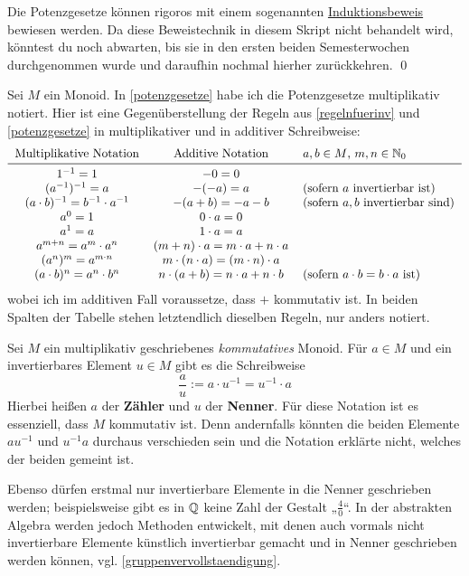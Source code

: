     
\begin{bew}
    Die Potenzgesetze können rigoros mit einem sogenannten \href{https://de.wikipedia.org/wiki/Vollst\%C3\%A4ndige_Induktion}{Induktionsbeweis} bewiesen werden. Da diese Beweistechnik in diesem Skript nicht behandelt wird, könntest du noch abwarten, bis sie in den ersten beiden Semesterwochen durchgenommen wurde und daraufhin nochmal hierher zurückkehren. \qed
\end{bew}


\begin{bem}[*]
    Sei $M$ ein Monoid. In \cref{potenzgesetze} habe ich die Potenzgesetze multiplikativ notiert. Hier ist eine Gegenüberstellung der Regeln aus \cref{regelnfuerinv} und \cref{potenzgesetze} in multiplikativer und in additiver Schreibweise:
    \[\begin{tabular}{ccl}
        Multiplikative Notation & Additive Notation & $a,b\in M$,\ $m,n\in \N_0$\\
        \midrule
        $1^{-1} = 1$ & $-0=0$ & \\
        $(a^{-1})^{-1} = a$ & $-(-a)=a$ & (sofern $a$ invertierbar ist) \\
        $(a\cdot b)^{-1} = b^{-1}\cdot a^{-1}$ & $-(a+b) = -a - b$ & (sofern $a,b$ invertierbar sind) \\
        $a^0 = 1$ & $0\cdot a = 0$ & \\
        $a^1 = a$ & $1\cdot a=a$ &\\
        $a^{m+n} = a^m\cdot a^n$ & $(m+n)\cdot a = m\cdot a + n\cdot a$ & \\
        $(a^n)^m = a^{m\cdot n}$ & $m\cdot (n\cdot a) = (m\cdot n)\cdot a$ & \\
        $(a\cdot b)^n =a^n\cdot b^n$ & $n\cdot (a+b) = n\cdot a+n\cdot b$ & (sofern $a\cdot b=b\cdot a$ ist)
    \end{tabular}\]
    wobei ich im additiven Fall voraussetze, dass $+$ kommutativ ist. In beiden Spalten der Tabelle stehen letztendlich dieselben Regeln, nur anders notiert.
\end{bem}


\begin{nota}[* Bruchschreibweise]  
    Sei $M$ ein multiplikativ geschriebenes \emph{kommutatives} Monoid. Für $a\in M$ und ein invertierbares Element $u\in M$ gibt es die Schreibweise
        \[ \frac{a}{u} := a\cdot u^{-1} = u^{-1} \cdot a\]
    Hierbei heißen $a$ der \textbf{Zähler} und $u$ der \textbf{Nenner}. Für diese Notation ist es essenziell, dass $M$ kommutativ ist. Denn andernfalls könnten die beiden Elemente $au^{-1}$ und $u^{-1}a$ durchaus verschieden sein und die Notation erklärte nicht, welches der beiden gemeint ist.
    
    Ebenso dürfen erstmal nur invertierbare Elemente in die Nenner geschrieben werden; beispielsweise gibt es in $\mathbb Q$ keine Zahl der Gestalt „$\frac{4}{0}$“. In der abstrakten Algebra werden jedoch Methoden entwickelt, mit denen auch vormals nicht invertierbare Elemente künstlich invertierbar gemacht und in Nenner geschrieben werden können, vgl. \cref{gruppenvervollstaendigung}.
\end{nota}


